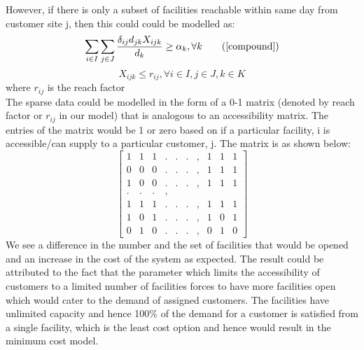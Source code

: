 \documentclass[12pt]{article}
\numberwithin{equation}{section}
\begin{document}
However, if there is only a subset of facilities reachable within same day from customer site j, then this could could be modelled as:
\begin{equation}
\sum_{i\in I}\sum_{j\in J}\frac{\delta_{ij}d_{jk}X_{ijk}}{d_k} \geq \alpha_{k},  \forall k \tag{\ref{compound}}
\end{equation}
\begin{equation}
\label{Reach}
X_{ijk} \leq r_{ij}, \forall i \in I,j \in J,k \in K    
\end{equation}
where $r_{ij}$ is the reach factor\\
The sparse data could be modelled in the form of a 0-1 matrix (denoted by reach factor or $r_{ij}$ in our model) that is analogous to an accessibility matrix. The entries of the matrix would be 1 or zero based on if a particular facility, i is accessible/can supply to a particular customer, j. The matrix is as shown below:
$$\left[\begin{array}{cccccccccc}
1 & 1 & 1 & . & . & . & , & 1 & 1 & 1\\
0 & 0 & 0 & . & . & . & , & 1 & 1 & 1\\
1 & 0 & 0 & . & . & . & , & 1 & 1 & 1\\
. & . & . & ,\\
1 & 1 & 1 & . & . & . & , & 1 & 1 & 1\\
1 & 0 & 1 & . & .& . & , & 1 & 0 & 1\\
0 & 1 & 0 & . & . & . & , & 0 & 1 & 0\end{array}\right]$$
We see a difference in the number and the set of facilities that would be opened and an increase in the cost of the system as expected. The result could be attributed to the fact that the parameter which limits the accessibility of customers to a limited number of facilities forces to have more facilities open which would cater to the demand of assigned customers. The facilities have unlimited capacity and hence 100\% of the demand for a customer is satisfied from a single facility, which is the least cost option and hence would result in the minimum cost model.
\end{document}
